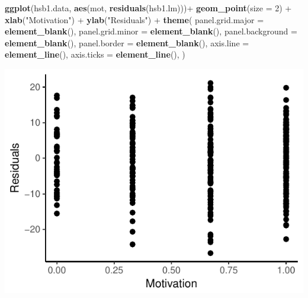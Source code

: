 \documentclass[]{article}
\newenvironment{Shaded}{\begin{snugshade}}{\end{snugshade}}
\newcommand{\KeywordTok}[1]{\textcolor[rgb]{0.13,0.29,0.53}{\textbf{{#1}}}}
\newcommand{\DataTypeTok}[1]{\textcolor[rgb]{0.13,0.29,0.53}{{#1}}}
\newcommand{\DecValTok}[1]{\textcolor[rgb]{0.00,0.00,0.81}{{#1}}}
\newcommand{\StringTok}[1]{\textcolor[rgb]{0.31,0.60,0.02}{{#1}}}
\newcommand{\NormalTok}[1]{{#1}}
\begin{document}
\begin{Shaded}
\begin{Highlighting}[]
\KeywordTok{ggplot}\NormalTok{(hsb1.data, }\KeywordTok{aes}\NormalTok{(mot, }\KeywordTok{residuals}\NormalTok{(hsb1.lm)))+}\StringTok{ }\KeywordTok{geom_point}\NormalTok{(}\DataTypeTok{size =} \DecValTok{2}\NormalTok{) +}\StringTok{ }\KeywordTok{xlab}\NormalTok{(}\StringTok{"Motivation"}\NormalTok{) +}\StringTok{ }\KeywordTok{ylab}\NormalTok{(}\StringTok{"Residuals"}\NormalTok{) +}
\StringTok{   }\KeywordTok{theme}\NormalTok{(}
        \DataTypeTok{panel.grid.major =} \KeywordTok{element_blank}\NormalTok{(),}
        \DataTypeTok{panel.grid.minor =} \KeywordTok{element_blank}\NormalTok{(),}
        \DataTypeTok{panel.background =} \KeywordTok{element_blank}\NormalTok{(),}
        \DataTypeTok{panel.border =} \KeywordTok{element_blank}\NormalTok{(),}
        \DataTypeTok{axis.line =} \KeywordTok{element_line}\NormalTok{(),}
        \DataTypeTok{axis.ticks =} \KeywordTok{element_line}\NormalTok{(),}
     \NormalTok{)}
\end{Highlighting}
\end{Shaded}

\includegraphics{Homework_3_Revised_Minoo_files/figure-latex/unnamed-chunk-4-3.pdf}
\end{document}
